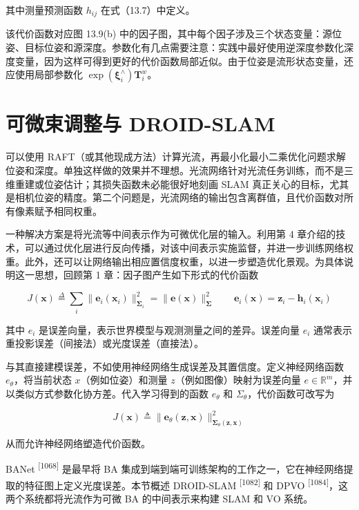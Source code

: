 其中测量预测函数 $h_{ij}$ 在式（13.7）中定义。

该代价函数对应图 13.9(b) 中的因子图，其中每个因子涉及三个状态变量：源位姿、目标位姿和源深度。参数化有几点需要注意：实践中最好使用逆深度参数化深度变量，因为这样可得到更好的代价函数局部近似。由于位姿是流形状态变量，还应使用局部参数化 $\exp(\pmb\xi_i^\wedge)\pmb T_i^w$。

\section{可微束调整与 DROID-SLAM}

可以使用 RAFT（或其他现成方法）计算光流，再最小化最小二乘优化问题求解位姿和深度。单独这样做的效果并不理想。光流网络针对光流任务训练，而不是三维重建或位姿估计；其损失函数未必能很好地刻画 SLAM 真正关心的目标，尤其是相机位姿的精度。第二个问题是，光流网络的输出包含离群值，且代价函数对所有像素赋予相同权重。

一种解决方案是将光流等中间表示作为可微优化层的输入。利用第 4 章介绍的技术，可以通过优化层进行反向传播，对该中间表示实施监督，并进一步训练网络权重。此外，还可以让网络输出相应置信度权重，以进一步塑造优化景观。为具体说明这一思想，回顾第 1 章：因子图产生如下形式的代价函数

\begin{equation}
J (\pmb {x}) \stackrel {\Delta} {=} \sum_ {i} \| \pmb {e} _ {i} (\pmb {x} _ {i}) \| _ {\pmb {\Sigma} _ {i}} ^ {2} = \| \pmb {e} (\pmb {x}) \| _ {\pmb {\Sigma}} ^ {2} \qquad \pmb {e} _ {i} (\pmb {x}) = \pmb {z} _ {i} - \pmb {h} _ {i} (\pmb {x} _ {i})\tag{13.9}
\end{equation}

其中 $e_i$ 是误差向量，表示世界模型与观测测量之间的差异。误差向量 $e_i$ 通常表示重投影误差（间接法）或光度误差（直接法）。

与其直接建模误差，不如使用神经网络生成误差及其置信度。定义神经网络函数 $e_\theta$，将当前状态 $x$（例如位姿）和测量 $z$（例如图像）映射为误差向量 $e\in\mathbb{R}^m$，并以类似方式参数化协方差。代入学习得到的函数 $e_\theta$ 和 $\Sigma_\theta$，代价函数可改写为

\begin{equation}
J (\pmb {x}) \triangleq \| \pmb {e} _ {\theta} (\pmb {z}, \pmb {x}) \| _ {\pmb {\Sigma} _ {\theta} (\pmb {z}, \pmb {x})} ^ {2}\tag{13.10}
\end{equation}

从而允许神经网络塑造代价函数。

BANet \textsuperscript{[1068]} 是最早将 BA 集成到端到端可训练架构的工作之一，它在神经网络提取的特征图上定义光度误差。本节概述 DROID-SLAM \textsuperscript{[1082]} 和 DPVO \textsuperscript{[1084]}，这两个系统都将光流作为可微 BA 的中间表示来构建 SLAM 和 VO 系统。

